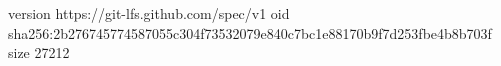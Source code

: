 version https://git-lfs.github.com/spec/v1
oid sha256:2b276745774587055c304f73532079e840c7bc1e88170b9f7d253fbe4b8b703f
size 27212
